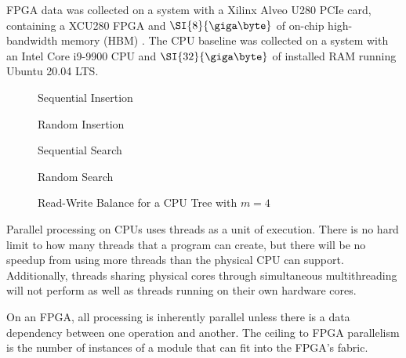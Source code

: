 
FPGA data was collected on a system with a Xilinx Alveo U280 PCIe card,
containing a XCU280 FPGA and $\SI{8}{\giga\byte}$ of on-chip high-bandwidth
memory (HBM) \autocite{u280}. The CPU baseline was collected on a system with an
Intel Core i9-9900 CPU and $\SI{32}{\giga\byte}$ of installed RAM running Ubuntu
20.04 LTS.




\begin{figure}[H]
	\centering
	
	\caption{Sequential Insertion}
	\label{fig:cpu-fanout-write}
\end{figure}

\begin{figure}[H]
	\centering
	
	\caption{Random Insertion}
	\label{fig:random-insertion}
\end{figure}



\begin{figure}[H]
	\centering
	
	\caption{Sequential Search}
	\label{fig:sequential-search}
\end{figure}

\begin{figure}[H]
	\centering
	
	\caption{Random Search}
	\label{fig:random-search}
\end{figure}



\begin{figure}[H]
	\centering
	
	\caption{Read-Write Balance for a CPU Tree with $m=4$}
	\label{fig:rw-balance}
\end{figure}



Parallel processing on CPUs uses threads as a unit of execution. There is no
hard limit to how many threads that a program can create, but there will be no
speedup from using more threads than the physical CPU can support. Additionally,
threads sharing physical cores through simultaneous multithreading will not
perform as well as threads running on their own hardware cores.

On an FPGA, all processing is inherently parallel unless there is a data
dependency between one operation and another. The ceiling to FPGA parallelism is
the number of instances of a module that can fit into the FPGA's fabric.


